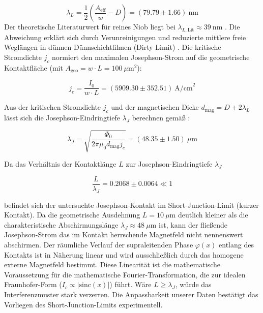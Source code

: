 \begin{equation}
    \lambda_L = \frac{1}{2} \left( \frac{A_{\text{eff}}}{w} - D \right) = (79.79 \pm 1.66)\ \text{nm}
\end{equation}
Der theoretische Literaturwert für reines Niob liegt bei $\lambda_{L,\text{Lit}} \approx \SI{39}{\nano\meter}$ \cite{kittel}. Die Abweichung erklärt sich durch Verunreinigungen und reduzierte mittlere freie Weglängen in dünnen Dünnschichtfilmen (Dirty Limit) \cite{Thesis}.
Die kritische Stromdichte $j_c$ normiert den maximalen Josephson-Strom auf die geometrische Kontaktfläche (mit $A_{\text{geo}} = w \cdot L = 100\ \mu\text{m}^2$):

\begin{equation}
j_c = \frac{I_0}{w \cdot L} = (5909.30 \pm 352.51)\ \text{A/cm}^2
\end{equation}

Aus der kritischen Stromdichte $j_c$ und der magnetischen Dicke $d_{\text{mag}} = D + 2\lambda_L$ lässt sich die Josephson-Eindringtiefe $\lambda_J$ berechnen gemäß \cite{Thesis}:

\begin{equation}
\lambda_J = \sqrt{\frac{\Phi_0}{2\pi \mu_0 d_{\text{mag}} j_c}} = (48.35 \pm 1.50)\ \mu\text{m}
\end{equation}

Da das Verhältnis der Kontaktlänge $L$ zur Josephson-Eindringtiefe $\lambda_J$

\begin{equation}
\frac{L}{\lambda_J} = 0.2068 \pm 0.0064 \ll 1
\end{equation}

befindet sich der untersuchte Josephson-Kontakt im Short-Junction-Limit (kurzer Kontakt).
Da die geometrische Ausdehnung $L = 10\ \mu\text{m}$ deutlich kleiner als die charakteristische Abschirmungslänge $\lambda_J \approx 48\ \mu\text{m}$ ist, kann der fließende Josephson-Strom das im Kontakt herrschende Magnetfeld nicht nennenswert abschirmen.
Der räumliche Verlauf der supraleitenden Phase $\varphi(x)$ entlang des Kontakts ist in  Näherung linear und wird ausschließlich durch das homogene externe Magnetfeld bestimmt.
Diese Linearität ist die mathematische Voraussetzung für die mathematische Fourier-Transformation, die zur idealen Fraunhofer-Form ($I_c \propto \vert{}\text{sinc}(x)\vert{}$) führt. Wäre $L \ge \lambda_J$, würde das Interferenzmuster stark verzerren. Die Anpassbarkeit unserer Daten bestätigt das Vorliegen des Short-Junction-Limits experimentell.